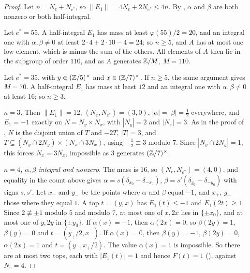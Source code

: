 \begin{proof}
Let $n=N_{e}+N_{e^{*}}$, so $\|E_{1}\|=4N_{e}+2N_{e^{*}}\le4n$. By
, $\alpha$ and $\beta$ are both nonzero or both
half-integral.

Let $e^{*}=55$. A half-integral $E_{1}$ has mass at least $\varphi(55)/2=20$,
and an integral one with $\alpha,\beta\ne0$ at least $2\cdot4+2\cdot10-4=24$;
so $n\ge5$, and $A$ has at most one low element, which is minus the sum of
the others. All elements of $A$ then lie in the subgroup of order $110$, and
as $A$ generates $\mathbb{Z}/M$, $M=110$.

Let $e^{*}=35$, with $y\in(\mathbb{Z}/5)^{\times}$ and $x\in(\mathbb{Z}/7)^{\times}$. If
$n\ge5$, the same argument gives $M=70$. A half-integral $E_{1}$ has mass at
least $12$ and an integral one with $\alpha,\beta\ne0$ at least $16$; so
$n\ge3$.

\emph{$n=3$.} Then $\|E_{1}\|=12$, $(N_{e},N_{e^{*}})=(3,0)$,
$|\alpha|=|\beta|=\frac12$ everywhere, and $E_{1}=-1$ exactly on
$N=N_{y}\times N_{x}$, with $|N_{y}|=2$ and $|N_{x}|=3$. As in the proof of
, $N$ is the disjoint union of $T$ and $-2T$, $|T|=3$, and
$T\subseteq(N_{y}\cap2N_{y})\times(N_{x}\cap3N_{x})$, using
$-\frac12\equiv3$ modulo $7$. Since $|N_{y}\cap2N_{y}|=1$, this forces
$N_{x}=3N_{x}$, impossible as $3$ generates $(\mathbb{Z}/7)^{\times}$.

\emph{$n=4$, $\alpha,\beta$ integral and nonzero.} The mass is $16$, so
$(N_{e},N_{e^{*}})=(4,0)$, and equality in the count above gives
$\alpha=s(\delta_{x_{0}}-\delta_{-x_{0}})$,
$\beta=s'(\delta_{y_{0}}-\delta_{-y_{0}})$ with signs $s,s'$. Let $x_{-}$ and
$y_{-}$ be the points where $\alpha$ and $\beta$ equal $-1$, and $x_{+}$,
$y_{+}$ those where they equal $1$. A top $t=(y,x)$ has $E_{1}(t)\le-1$ and
$E_{1}(2t)\ge1$. Since $2\not\equiv\pm1$ modulo $5$ and modulo $7$, at most
one of $x,2x$ lies in $\{\pm x_{0}\}$, and at most one of $y,2y$ in
$\{\pm y_{0}\}$. If $\alpha(x)=-1$, then $\alpha(2x)=0$, so $\beta(2y)=1$,
$\beta(y)=0$ and $t=(y_{+}/2,x_{-})$. If $\alpha(x)=0$, then $\beta(y)=-1$,
$\beta(2y)=0$, $\alpha(2x)=1$ and $t=(y_{-},x_{+}/2)$. The value $\alpha(x)=1$
is impossible. So there are at most two tops, each with $|E_{1}(t)|=1$ and
hence $F(t)=1$ (), against $N_{e}=4$.


\end{proof}
